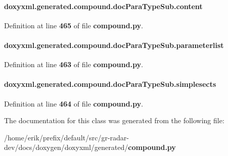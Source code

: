 \paragraph[{content}]{\setlength{\rightskip}{0pt plus 5cm}doxyxml.\+generated.\+compound.\+doc\+Para\+Type\+Sub.\+content}\label{classdoxyxml_1_1generated_1_1compound_1_1docParaTypeSub_a0be9a6b4807f6139ad56ebf1001d2bf6}


Definition at line {\bf 465} of file {\bf compound.\+py}.

\paragraph[{parameterlist}]{\setlength{\rightskip}{0pt plus 5cm}doxyxml.\+generated.\+compound.\+doc\+Para\+Type\+Sub.\+parameterlist}\label{classdoxyxml_1_1generated_1_1compound_1_1docParaTypeSub_aa41cc0b961288aedff7a3391b197b0c6}


Definition at line {\bf 463} of file {\bf compound.\+py}.

\paragraph[{simplesects}]{\setlength{\rightskip}{0pt plus 5cm}doxyxml.\+generated.\+compound.\+doc\+Para\+Type\+Sub.\+simplesects}\label{classdoxyxml_1_1generated_1_1compound_1_1docParaTypeSub_a94df1ea8b20d0f08e9d2a24af36b576f}


Definition at line {\bf 464} of file {\bf compound.\+py}.



The documentation for this class was generated from the following file\+:\begin{DoxyCompactItemize}
\item 
/home/erik/prefix/default/src/gr-\/radar-\/dev/docs/doxygen/doxyxml/generated/{\bf compound.\+py}\end{DoxyCompactItemize}
